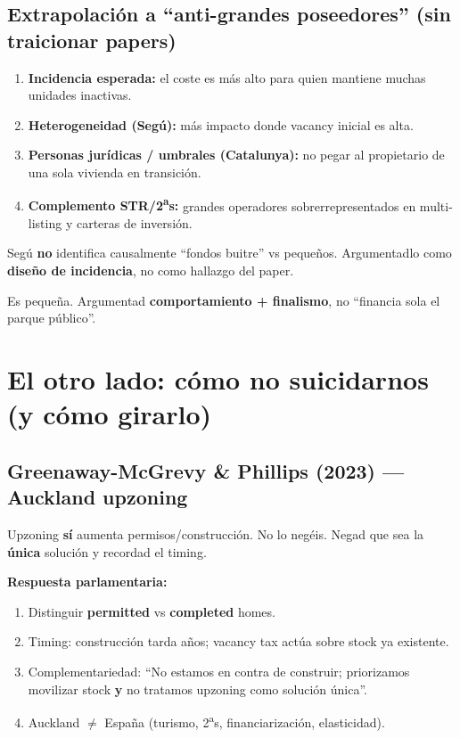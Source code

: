 \documentclass[11pt,a4paper]{report}
\begin{document}
\section{Extrapolaci\'on a ``anti-grandes poseedores'' (sin traicionar papers)}

\begin{enumerate}
  \item \textbf{Incidencia esperada:} el coste es m\'as alto para quien mantiene
        muchas unidades inactivas.
  \item \textbf{Heterogeneidad (Seg\'u):} m\'as impacto donde vacancy inicial es alta.
  \item \textbf{Personas jur\'idicas / umbrales (Catalunya):} no pegar al propietario
        de una sola vivienda en transici\'on.
  \item \textbf{Complemento STR/2\textsuperscript{a}s:} grandes operadores sobrerrepresentados
        en multi-listing y carteras de inversi\'on.
\end{enumerate}

\begin{cuidado}
Seg\'u \textbf{no} identifica causalmente ``fondos buitre'' vs peque\~nos.
Argumentadlo como \textbf{dise\~no de incidencia}, no como hallazgo del paper.
\end{cuidado}

\begin{cuidado}[title={Recaudaci\'on CAT $\approx$ 7\,M€}]
Es peque\~na. Argumentad \textbf{comportamiento + finalismo}, no
``financia sola el parque p\'ublico''.
\end{cuidado}

\chapter{El otro lado: c\'omo no suicidarnos (y c\'omo girarlo)}
\label{ch:otro-lado}

\section{Greenaway-McGrevy \& Phillips (2023) --- Auckland upzoning}

\begin{intuicion}
Upzoning \textbf{s\'i} aumenta permisos/construcci\'on. No lo neg\'eis.
Negad que sea la \textbf{\'unica} soluci\'on y recordad el timing.
\end{intuicion}

\textbf{Respuesta parlamentaria:}
\begin{enumerate}
  \item Distinguir \textbf{permitted} vs \textbf{completed} homes.
  \item Timing: construcci\'on tarda a\~nos; vacancy tax act\'ua sobre stock ya existente.
  \item Complementariedad: ``No estamos en contra de construir; priorizamos movilizar stock
        \textbf{y} no tratamos upzoning como soluci\'on \'unica''.
  \item Auckland $\neq$ Espa\~na (turismo, 2\textsuperscript{a}s, financiarizaci\'on, elasticidad).
\end{enumerate}
\end{document}
